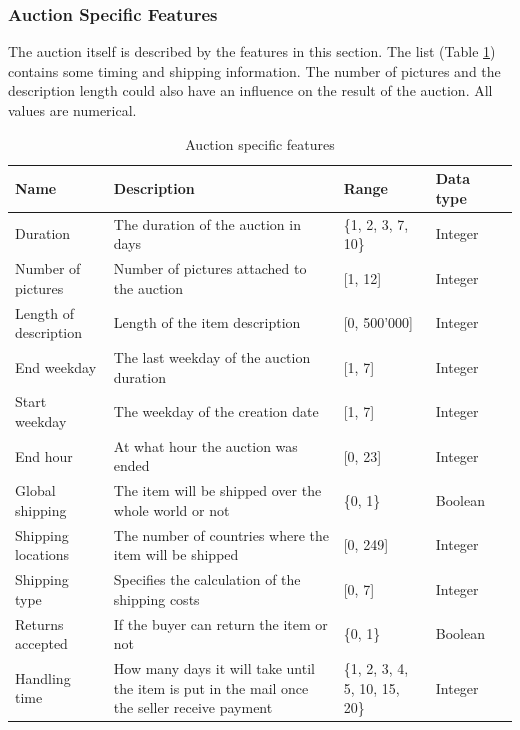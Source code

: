 \subsubsection{Auction Specific Features}
The auction itself is described by the features in this section. The list (Table \ref{tab:auction_features}) contains some timing and shipping information. The number of pictures and the description length could also have an influence on the result of the auction. All values are numerical.
\begin{table}[h!]
	\begin{center}
	\begin{tabular}{| p{2.6cm} | p{2.6cm} | p{2.6cm} | p{2.6cm} | p{2.6cm} |}
		\hline
		\textbf{Name} & \textbf{Description} &  \textbf{Range} & \textbf{Data type} \\
		\hline
		Duration & The duration of the auction in days & \{1, 2, 3, 7, 10\} & Integer \\
		\hline
		Number of pictures & Number of pictures attached to the auction & [1, 12] & Integer \\
		\hline
		Length of description & Length of the item description & [0, 500'000] & Integer \\
		\hline
		End weekday & The last weekday of the auction duration & [1, 7] & Integer \\
		\hline
		Start weekday & The weekday of the creation date & [1, 7] & Integer \\
		\hline
		End hour & At what hour the auction was ended & [0, 23] & Integer \\
		\hline
		Global shipping & The item will be shipped over the whole world or not & \{0, 1\} & Boolean \\
		\hline
		Shipping locations & The number of countries where the item will be shipped & [0, 249] & Integer \\
		\hline
		Shipping type & Specifies the calculation of the shipping costs & [0, 7] & Integer \\
		\hline
		Returns accepted & If the buyer can return the item or not & \{0, 1\} & Boolean \\
		\hline
		Handling time & How many days it will take until the item is put in the mail once the seller receive payment & \{1, 2, 3, 4, 5, 10, 15, 20\} & Integer \\
		\hline
	\end{tabular}
	\end{center}
	\caption{Auction specific features}
	\label{tab:auction_features}
\end{table}
